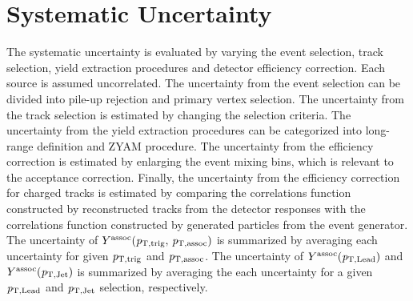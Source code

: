 \section{Systematic Uncertainty}
\label{sec:uncertainties}
The systematic uncertainty is evaluated by varying the event selection, track selection, yield extraction procedures and detector efficiency correction. Each source is assumed uncorrelated. The uncertainty from the event selection can be divided into pile-up rejection and primary vertex selection. The uncertainty from the track selection is estimated by changing the selection criteria. The uncertainty from the yield extraction procedures can be categorized into long-range definition and ZYAM procedure. The uncertainty from the efficiency correction is estimated by enlarging the event mixing bins, which is relevant to the acceptance correction.
Finally, the uncertainty from the efficiency correction for charged tracks is estimated by comparing the correlations function constructed by reconstructed tracks from the detector responses with the correlations function constructed by generated particles from the event generator.
The uncertainty of $Y^{\rm{assoc}}(\it{p}_{\rm{T, trig}},\,\it{p}_{\rm{T, assoc}})$ is summarized by averaging each uncertainty for given $\it{p}_{\rm{T, trig}}$ and $\it{p}_{\rm{T, assoc}}$. The uncertainty of $Y^{\rm{assoc}}(\it{p}_{\rm{T, Lead}})$ and $Y^{\rm{assoc}}(\it{p}_{\rm{T, Jet}})$ is summarized by averaging the each uncertainty for a given $\it{p}_{\rm{T, Lead}}$ and $\it{p}_{\rm{T, Jet}}$ selection, respectively.

